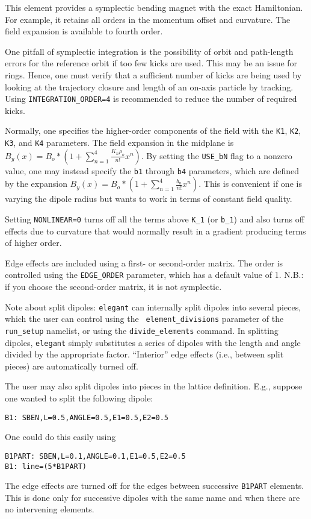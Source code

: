 This element provides a symplectic bending magnet with the exact
Hamiltonian.  For example, it retains all orders in the momentum offset
and curvature.  The field expansion is available to fourth order.

One pitfall of symplectic integration is the possibility of orbit and
path-length errors for the reference orbit if too few kicks are used.
This may be an issue for rings.  Hence, one must verify that a
sufficient number of kicks are being used by looking at the trajectory
closure and length of an on-axis particle by tracking.  Using 
{\tt INTEGRATION\_ORDER=4} is recommended to reduce the number of
required kicks.

Normally, one specifies the higher-order components of the field with
the {\tt K1}, {\tt K2}, {\tt K3}, and {\tt K4} parameters. The field
expansion in the midplane is $B_y(x) = B_o * (1 +
\sum_{n=1}^4\frac{K_n\rho_o}{n!}x^n)$.  By setting the {\tt USE\_bN}
flag to a nonzero value, one may instead specify the {\tt b1} through
{\tt b4} parameters, which are defined by the expansion $B_y(x) = B_o
* (1 + \sum_{n=1}^4\frac{b_n}{n!}x^n)$.  This is convenient if one is
varying the dipole radius but wants to work in terms of constant field
quality.  

Setting {\tt NONLINEAR=0} turns off all the terms above {\tt K\_1} (or {\tt b\_1}) and
also turns off effects due to curvature that would
normally result in a gradient producing terms of higher order.

Edge effects are included using a first- or second-order matrix.  The
order is controlled using the {\tt EDGE\_ORDER} parameter, which has a
default value of 1.  N.B.: if you choose the second-order matrix, it
is not symplectic.

Note about split dipoles: {\tt elegant} can internally split dipoles
into several pieces, which the user can control using the {\tt
element\_divisions} parameter of the {\tt run\_setup} namelist, or
using the {\tt divide\_elements} command.  In splitting dipoles, {\tt elegant}
simply substitutes a series of dipoles with the length and angle divided by
the appropriate factor.  ``Interior'' edge effects (i.e., between split
pieces) are automatically turned off.

The user may also split dipoles into pieces in the lattice definition.  E.g.,
suppose one wanted to split the following dipole:
\begin{verbatim}
B1: SBEN,L=0.5,ANGLE=0.5,E1=0.5,E2=0.5
\end{verbatim}
One could do this easily using
\begin{verbatim}
B1PART: SBEN,L=0.1,ANGLE=0.1,E1=0.5,E2=0.5
B1: line=(5*B1PART)
\end{verbatim}
The edge effects are turned off for the edges between successive {\tt B1PART} elements.
This is done only for successive dipoles with the same name and when there
are no intervening elements.

